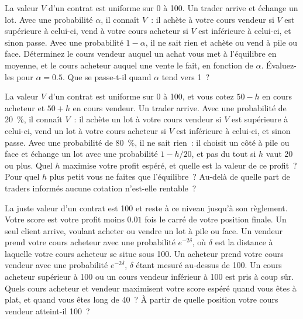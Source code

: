 \begin{question}\label{iq:iv2:making-a-market:24}
La valeur $V$ d'un contrat est uniforme sur 0 à 100. Un trader arrive et échange un lot. Avec une probabilité $\alpha$, il connaît $V$~: il achète à votre cours vendeur si $V$ est supérieure à celui-ci, vend à votre cours acheteur si $V$ est inférieure à celui-ci, et sinon passe. Avec une probabilité $1 - \alpha$, il ne sait rien et achète ou vend à pile ou face. Déterminez le cours vendeur auquel un achat vous met à l'équilibre en moyenne, et le cours acheteur auquel une vente le fait, en fonction de $\alpha$. Évaluez-les pour $\alpha = 0.5$. Que se passe-t-il quand $\alpha$ tend vers 1~?
\end{question}

\begin{question}\label{iq:iv2:making-a-market:25}
La valeur $V$ d'un contrat est uniforme sur 0 à 100, et vous cotez $50 - h$ en cours acheteur et $50 + h$ en cours vendeur. Un trader arrive. Avec une probabilité de 20~\%, il connaît $V$~: il achète un lot à votre cours vendeur si $V$ est supérieure à celui-ci, vend un lot à votre cours acheteur si $V$ est inférieure à celui-ci, et sinon passe. Avec une probabilité de 80~\%, il ne sait rien~: il choisit un côté à pile ou face et échange un lot avec une probabilité $1 - h/20$, et pas du tout si $h$ vaut 20 ou plus. Quel $h$ maximise votre profit espéré, et quelle est la valeur de ce profit~? Pour quel $h$ plus petit vous ne faites que l'équilibre~? Au-delà de quelle part de traders informés aucune cotation n'est-elle rentable~?
\end{question}

\begin{question}\label{iq:iv2:making-a-market:26}
La juste valeur d'un contrat est 100 et reste à ce niveau jusqu'à son règlement. Votre score est votre profit moins $0.01$ fois le carré de votre position finale. Un seul client arrive, voulant acheter ou vendre un lot à pile ou face. Un vendeur prend votre cours acheteur avec une probabilité $e^{-2\delta}$, où $\delta$ est la distance à laquelle votre cours acheteur se situe sous 100. Un acheteur prend votre cours vendeur avec une probabilité $e^{-2\delta}$, $\delta$ étant mesuré au-dessus de 100. Un cours acheteur supérieur à 100 ou un cours vendeur inférieur à 100 est pris à coup sûr. Quels cours acheteur et vendeur maximisent votre score espéré quand vous êtes à plat, et quand vous êtes long de 40~? À partir de quelle position votre cours vendeur atteint-il 100~?
\end{question}

